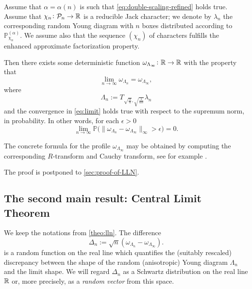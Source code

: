 \documentclass[12pt,usenames,dvipsnames,svgnames,table]{amsart}
\begin{document}
\begin{theorem}
	\label{theo:lln}
	Assume that $\alpha=\alpha(n)$ is such that \eqref{eq:double-scaling-refined} holds true.
	Assume that $\chi_n\colon\mathcal{P}_{n}\to\mathbb{R}$ is a reducible Jack character; 
	we denote by $\lambda_n$ the corresponding random Young diagram with $n$ boxes
	distributed according to $\mathbb{P}^{(\alpha)}_{\chi_n}$.
	We assume also that the sequence $(\chi_n)$ of characters fulfills the enhanced approximate factorization property.
	
	Then there exists some deterministic function $\omega_{\Lambda_\infty}\colon\mathbb{R}\to\mathbb{R}$ 
	with the property that 
	\begin{equation}
	\label{eq:limit}
	\lim_{n\to\infty} \omega_{\Lambda_n} = \omega_{\Lambda_\infty},
	\end{equation}
	where 
	\begin{equation}
	\label{eq:Lambda}
	\Lambda_n:= T_{\sqrt{\frac{\alpha}{n}},\sqrt{\frac{1}{\alpha n}}} \lambda_n    
	\end{equation}
	and the convergence in \eqref{eq:limit} holds true with respect to the supremum norm, in probability.
	In other words, for each $\epsilon>0$
	\[ \lim_{n\to\infty} \mathbb{P}\big( \|\omega_{\Lambda_n}-\omega_{\Lambda_\infty}   \|_\infty>
	\epsilon \big) =0 .\]
\end{theorem}

\begin{remark}
The concrete formula for the profile $\omega_{\Lambda_\infty}$ may be obtained
by computing the corresponding $R$-transform and Cauchy transform, see
for example \cite[Theorem 3]{Biane2001}.
\end{remark}

The proof is postponed to \cref{sec:proof-of-LLN}.

\subsection{The second main result: Central Limit Theorem}
\label{sec:clt-simple}
We keep the notations from \cref{theo:lln}.
The difference 
\begin{equation}
\label{eq:fluctuations-around-infty}
\Delta_n:= \sqrt{n} \left( \omega_{\Lambda_n}- \omega_{\Lambda_\infty} \right).
\end{equation}
is a random function on the real line which quantifies 
the (suitably rescaled) discrepancy
between the shape of the random (anisotropic) Young diagram $\Lambda_n$
and the limit shape.
We will regard ${\Delta}_n$
as a Schwartz  distribution on the real line $\mathbb{R}$ or,
more precisely, as a \emph{random vector} from this space.
\end{document}
